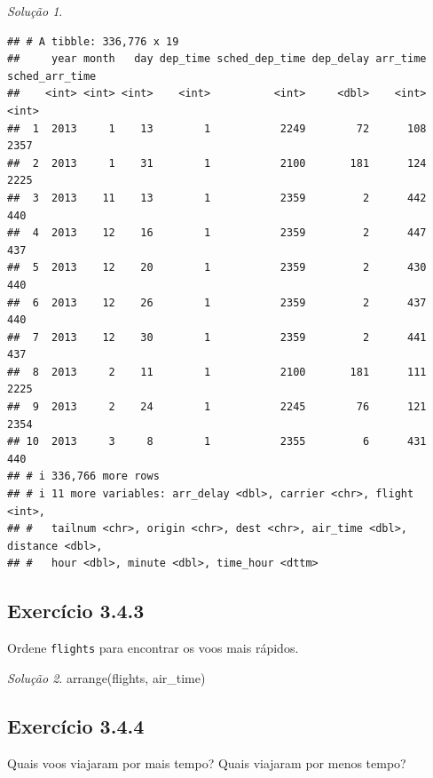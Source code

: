 \documentclass[
]{latex/krantz}
\theoremstyle{definition}
\theoremstyle{definition}
\theoremstyle{definition}
\theoremstyle{definition}
\theoremstyle{remark}
\newtheorem*{solution}{Solução}
\begin{document}
\begin{solution}
\begin{verbatim}
## # A tibble: 336,776 x 19
##     year month   day dep_time sched_dep_time dep_delay arr_time sched_arr_time
##    <int> <int> <int>    <int>          <int>     <dbl>    <int>          <int>
##  1  2013     1    13        1           2249        72      108           2357
##  2  2013     1    31        1           2100       181      124           2225
##  3  2013    11    13        1           2359         2      442            440
##  4  2013    12    16        1           2359         2      447            437
##  5  2013    12    20        1           2359         2      430            440
##  6  2013    12    26        1           2359         2      437            440
##  7  2013    12    30        1           2359         2      441            437
##  8  2013     2    11        1           2100       181      111           2225
##  9  2013     2    24        1           2245        76      121           2354
## 10  2013     3     8        1           2355         6      431            440
## # i 336,766 more rows
## # i 11 more variables: arr_delay <dbl>, carrier <chr>, flight <int>,
## #   tailnum <chr>, origin <chr>, dest <chr>, air_time <dbl>, distance <dbl>,
## #   hour <dbl>, minute <dbl>, time_hour <dttm>
\end{verbatim}

\end{solution}

\hypertarget{exr3-4-3}{%
\subsection*{Exercício 3.4.3}\label{exr3-4-3}}

Ordene \texttt{flights} para encontrar os voos mais rápidos.

\begin{solution}
arrange(flights, air\_time)
\end{solution}

\hypertarget{exr3-4-4}{%
\subsection*{Exercício 3.4.4}\label{exr3-4-4}}

Quais voos viajaram por mais tempo? Quais viajaram por menos tempo?
\end{document}
